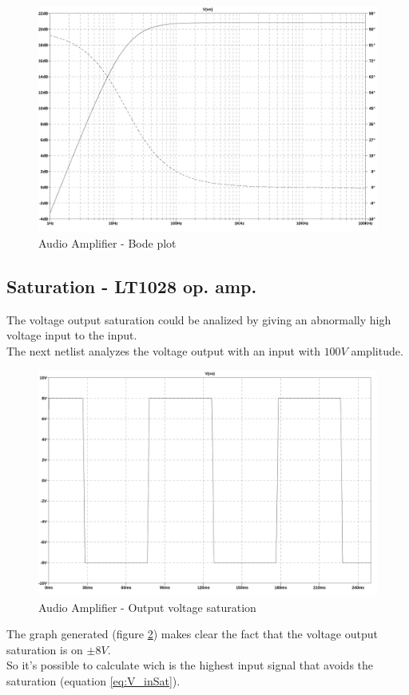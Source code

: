 \documentclass[10pt,a4paper]{article}
\begin{document}
\begin{figure}[H]
  \centering
  \includegraphics[width=14cm]{graph/1d3.jpg}
  \caption{Audio Amplifier - Bode plot}
  \label{1d3graph}
\end{figure}

\subsection{Saturation - LT1028 op. amp.}
The voltage output saturation could be analized by giving an abnormally high voltage input to the input.\\
The next netlist analyzes the voltage output with an input with $100V$ amplitude.\\



\begin{figure}[H]
  \centering
  \includegraphics[width=14cm]{graph/1d4.jpg}
  \caption{Audio Amplifier - Output voltage saturation}
  \label{1d4graph}
\end{figure}
The graph generated (figure \ref{1d4graph}) makes clear the fact that the voltage output saturation is on $\pm8V$.\\
So it's possible to calculate wich is the highest input signal that avoids the saturation (equation \ref{eq:V_inSat}).\\
\end{document}
